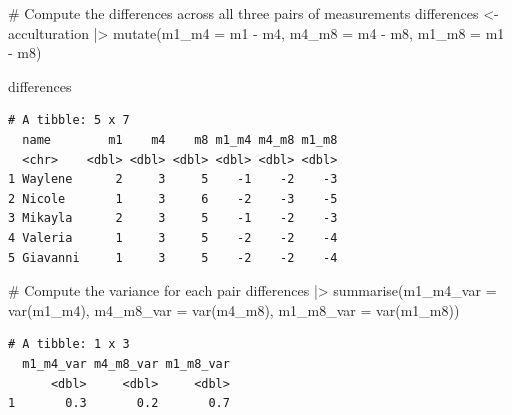 \documentclass[
  letterpaper,
]{krantz}
\makeatletter
\newenvironment{Shaded}{\begin{snugshade}}{\end{snugshade}}
\newcommand{\AttributeTok}[1]{\textcolor[rgb]{0.40,0.45,0.13}{#1}}
\newcommand{\CommentTok}[1]{\textcolor[rgb]{0.37,0.37,0.37}{#1}}
\newcommand{\FunctionTok}[1]{\textcolor[rgb]{0.28,0.35,0.67}{#1}}
\newcommand{\NormalTok}[1]{\textcolor[rgb]{0.00,0.23,0.31}{#1}}
\newcommand{\OtherTok}[1]{\textcolor[rgb]{0.00,0.23,0.31}{#1}}
\newcommand{\SpecialCharTok}[1]{\textcolor[rgb]{0.37,0.37,0.37}{#1}}
\newenvironment{kframe}{%
\medskip{}
\setlength{\fboxsep}{.8em}
 \def\at@end@of@kframe{}%
 \ifinner\ifhmode%
  \def\at@end@of@kframe{\end{minipage}}%
  \begin{minipage}{\columnwidth}%
 \fi\fi%
 \def\FrameCommand##1{\hskip\@totalleftmargin \hskip-\fboxsep
 \colorbox{shadecolor}{##1}\hskip-\fboxsep
     \hskip-\linewidth \hskip-\@totalleftmargin \hskip\columnwidth}%
 \MakeFramed {\advance\hsize-\width
   \@totalleftmargin\z@ \linewidth\hsize
   \@setminipage}}%
 {\par\unskip\endMakeFramed%
 \at@end@of@kframe}
\renewenvironment{Shaded}{\begin{kframe}}{\end{kframe}}
\makeatother
\begin{document}
\begin{Shaded}
\begin{Highlighting}[]
\CommentTok{\# Compute the differences across all three pairs of measurements}
\NormalTok{differences }\OtherTok{\textless{}{-}}
\NormalTok{  acculturation }\SpecialCharTok{|\textgreater{}}
  \FunctionTok{mutate}\NormalTok{(}\AttributeTok{m1\_m4 =}\NormalTok{ m1 }\SpecialCharTok{{-}}\NormalTok{ m4,}
         \AttributeTok{m4\_m8 =}\NormalTok{ m4 }\SpecialCharTok{{-}}\NormalTok{ m8,}
         \AttributeTok{m1\_m8 =}\NormalTok{ m1 }\SpecialCharTok{{-}}\NormalTok{ m8)}

\NormalTok{differences}
\end{Highlighting}
\end{Shaded}

\begin{verbatim}
# A tibble: 5 x 7
  name        m1    m4    m8 m1_m4 m4_m8 m1_m8
  <chr>    <dbl> <dbl> <dbl> <dbl> <dbl> <dbl>
1 Waylene      2     3     5    -1    -2    -3
2 Nicole       1     3     6    -2    -3    -5
3 Mikayla      2     3     5    -1    -2    -3
4 Valeria      1     3     5    -2    -2    -4
5 Giavanni     1     3     5    -2    -2    -4
\end{verbatim}

\begin{Shaded}
\begin{Highlighting}[]
\CommentTok{\# Compute the variance for each pair}
\NormalTok{differences }\SpecialCharTok{|\textgreater{}}
  \FunctionTok{summarise}\NormalTok{(}\AttributeTok{m1\_m4\_var =} \FunctionTok{var}\NormalTok{(m1\_m4),}
            \AttributeTok{m4\_m8\_var =} \FunctionTok{var}\NormalTok{(m4\_m8),}
            \AttributeTok{m1\_m8\_var =} \FunctionTok{var}\NormalTok{(m1\_m8))}
\end{Highlighting}
\end{Shaded}

\begin{verbatim}
# A tibble: 1 x 3
  m1_m4_var m4_m8_var m1_m8_var
      <dbl>     <dbl>     <dbl>
1       0.3       0.2       0.7
\end{verbatim}
\end{document}
